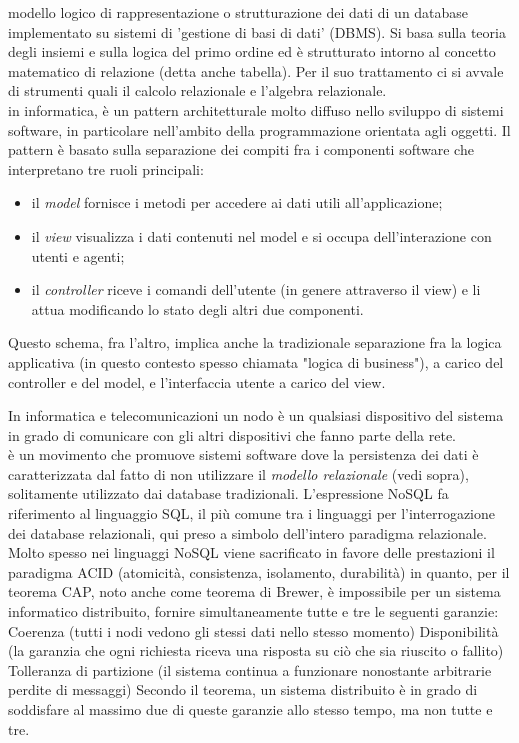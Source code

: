 \documentclass{scalatekids-article}
\begin{document}
   modello logico di rappresentazione o strutturazione dei dati di un database implementato su sistemi di 'gestione di basi di dati' (DBMS).
  Si basa sulla teoria degli insiemi e sulla logica del primo ordine ed è strutturato intorno al concetto matematico di relazione (detta anche tabella). Per il suo trattamento ci si avvale di strumenti quali il calcolo relazionale e l'algebra relazionale.
  \\
  
   in informatica, è un pattern architetturale molto diffuso nello sviluppo di sistemi software, in particolare nell'ambito della programmazione orientata agli oggetti.
  Il pattern è basato sulla separazione dei compiti fra i componenti software che interpretano tre ruoli principali:
  \begin{itemize}
  	\item il \textit{model} fornisce i metodi per accedere ai dati utili all'applicazione;
	\item il \textit{view} visualizza i dati contenuti nel model e si occupa dell'interazione con utenti e agenti;
	\item il \textit{controller} riceve i comandi dell'utente (in genere attraverso il view) e li attua modificando lo stato degli altri due componenti.
  \end{itemize}
  Questo schema, fra l'altro, implica anche la tradizionale separazione fra la logica applicativa (in questo contesto spesso chiamata "logica di business"), a carico del controller e del model, e l'interfaccia utente a carico del view.
  \\


   In informatica e telecomunicazioni un nodo è un qualsiasi dispositivo del sistema in grado di comunicare con gli altri dispositivi che fanno parte della rete.
  \\

   è un movimento che promuove sistemi software dove la persistenza dei dati è caratterizzata dal fatto di non utilizzare il \textit{modello relazionale} (vedi sopra), solitamente utilizzato dai database tradizionali.
  L'espressione NoSQL fa riferimento al linguaggio SQL, il più comune tra i linguaggi per l'interrogazione dei database relazionali, qui preso a simbolo dell'intero paradigma relazionale. Molto spesso nei linguaggi NoSQL viene sacrificato in favore delle prestazioni il paradigma ACID (atomicità, consistenza, isolamento, durabilità) in quanto, per il teorema CAP, noto anche come teorema di Brewer, è impossibile per un sistema informatico distribuito, fornire simultaneamente tutte e tre le seguenti garanzie:
  Coerenza (tutti i nodi vedono gli stessi dati nello stesso momento)
  Disponibilità (la garanzia che ogni richiesta riceva una risposta su ciò che sia riuscito o fallito)
  Tolleranza di partizione (il sistema continua a funzionare nonostante arbitrarie perdite di messaggi)
  Secondo il teorema, un sistema distribuito è in grado di soddisfare al massimo due di queste garanzie allo stesso tempo, ma non tutte e tre.
  \\
\end{document}
